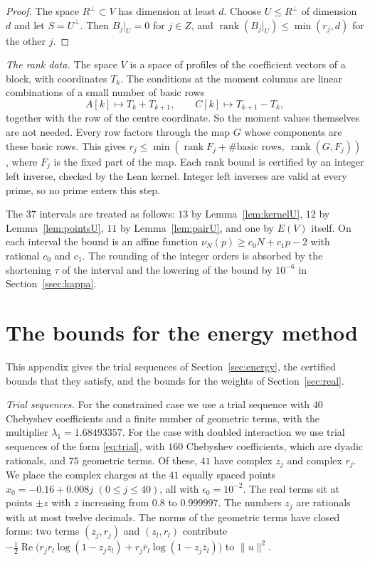 \documentclass[11pt]{amsart}
\newcommand{\Kcoef}{160}
\newcommand{\Ngeo}{75}
\newcommand{\Ncomplex}{41}
\theoremstyle{definition}
\theoremstyle{remark}
\numberwithin{equation}{section}
\newcommand{\rank}{\operatorname{rank}}
\begin{document}
\begin{proof}
The space $R^\perp\subset V$ has dimension at least $d$. Choose $U\le R^\perp$ of dimension $d$ and let $S=U^\perp$. Then $B_j|_U=0$ for $j\in Z$, and $\rank(B_j|_U)\le\min(r_j,d)$ for
the other $j$.
\end{proof}

\emph{The rank data.} The space $V$ is a space of profiles of the coefficient vectors of a block, with coordinates
$T_k$. The conditions at the moment columns are linear combinations of a small number of basic rows
\[
 A[k]\mapsto T_k+T_{k+1},\qquad C[k]\mapsto T_{k+1}-T_k,
\]
together with the row of the centre coordinate. So the moment values themselves are not needed. Every row factors
through the map $G$ whose components are these basic rows. This gives $r_j\le\min(\rank F_j+\#\text{basic rows},\ \rank(G,F_j))$, where $F_j$ is the fixed part
of the map. Each rank bound is certified by an integer left inverse, checked by the Lean kernel. Integer left
inverses are valid at every prime, so no prime enters this step.

The $37$ intervals are treated as follows: $13$ by Lemma~\ref{lem:kernelU}, $12$ by Lemma~\ref{lem:pointsU}, $11$ by
Lemma~\ref{lem:pairU}, and one by $E(V)$ itself. On each interval the bound is an affine function
$\nu_N(p)\ge c_0N+c_1p-2$ with rational $c_0$ and $c_1$. The rounding of the integer orders is absorbed by
the shortening $\tau$ of the interval and the lowering of the bound by $10^{-6}$ in Section~\ref{ssec:kappa}.

\section{The bounds for the energy method}\label{app:field}

This appendix gives the trial sequences of Section~\ref{sec:energy}, the certified bounds that they satisfy, and
the bounds for the weights of Section~\ref{sec:real}.

\emph{Trial sequences.} For the constrained case we use a trial sequence with $40$ Chebyshev coefficients and a
finite number of geometric terms, with the multiplier $\lambda_1=1.68493357$. For the case with doubled
interaction we use trial sequences of the form \eqref{eq:trial}, with $\Kcoef$ Chebyshev coefficients, which are
dyadic rationals, and $\Ngeo$ geometric terms. Of these, $\Ncomplex$ have complex $z_j$ and complex $r_j$. We
place the complex charges at the $41$ equally spaced points $x_0=-0.16+0.008j$ $(0\le j\le40)$, all with
$\epsilon_0=10^{-2}$. The real terms sit at points $\pm z$ with $z$ increasing from $0.8$ to $0.999997$. The
numbers $z_j$ are rationals with at most twelve decimals. The norms of the geometric terms have closed forms:
two terms $(z_j,r_j)$ and $(z_l,r_l)$ contribute
$-\frac12\operatorname{Re}\bigl(r_jr_l\log(1-z_jz_l)+r_j\bar r_l\log(1-z_j\bar z_l)\bigr)$ to $\|u\|^2$.
\end{document}
